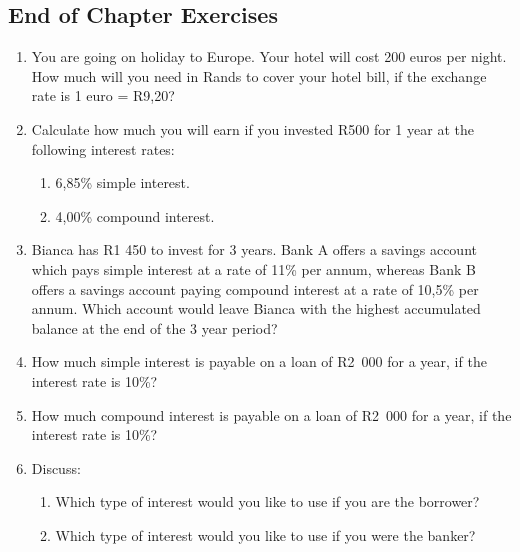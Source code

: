             \subsection{ End of Chapter Exercises}
            \nopagebreak
            \label{m39335*id75641}\begin{enumerate}[noitemsep, label=\textbf{\arabic*}. ] 
            \label{m39335*uid79}\item You are going on holiday to Europe. Your hotel will cost 200 euros per night. How much will you need in Rands to cover your hotel bill, if the exchange rate is 1 euro = R9,20?\newline
    
        
\label{m39335*uid80}\item Calculate how much you will earn if you invested R500 for 1 year at the following interest rates:
\label{m39335*id75671}\begin{enumerate}[noitemsep, label=\textbf{\alph*}. ] 
            \label{m39335*uid81}\item 6,85\% simple interest.
\label{m39335*uid82}\item 4,00\% compound interest.
\end{enumerate}
                
\label{m39335*uid83}\item Bianca has R1 450 to invest for 3 years. Bank A offers a savings account which pays simple interest at a rate of 11\% per annum, whereas Bank B offers a savings account paying compound interest at a rate of 10,5\% per annum. Which account would leave Bianca with the highest accumulated balance at the end of the 3 year period?\newline
    
        
\label{m39335*uid84}\item How much simple interest is payable on a loan of R2~000 for a year, if the interest rate is 10\%?\newline
    
        
\label{m39335*uid85}\item How much compound interest is payable on a loan of R2~000 for a year, if the interest rate is 10\%?\newline
    
        
\label{m39335*uid86}\item Discuss:
\label{m39335*id75754}\begin{enumerate}[noitemsep, label=\textbf{\alph*}. ] 
            \label{m39335*uid87}\item Which type of interest would you like to use if you are the borrower?
\label{m39335*uid88}\item Which type of interest would you like to use if you were the banker?
\end{enumerate}
                

\end{enumerate}
